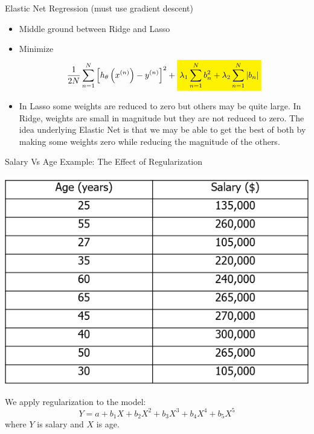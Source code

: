 \documentclass[11pt]{beamer}
\newcommand{\highlight}[1]{%
  \colorbox{yellow!100}{$\displaystyle#1$}}
\begin{document}
\begin{frame}{Elastic Net Regression (must use gradient descent)}
	\begin{itemize}
		\item Middle ground between Ridge and Lasso
		\item Minimize
		\begin{equation}
		\frac{1}{2N} \sum\limits_{n=1}^N \left[h_\theta \left( x^{(n)} \right) - y ^{(n)}\right]^2 + \highlight{\lambda_1 \sum\limits_{n=1}^N b_n^2 + \lambda_2 \sum\limits_{n=1}^N \vert b_n \vert}
		\end{equation}
		\item In Lasso some weights are reduced to zero but others may be quite large. In Ridge, weights are small in magnitude but they are not reduced to zero. The idea underlying Elastic Net is that we may be able to get the best of both by making some weights zero while reducing the magnitude of the others.
	\end{itemize}
\end{frame}
\begin{frame}{Salary Vs Age Example: The Effect of Regularization}
	\begin{center}
	\includegraphics[scale=.4]{../05-pictures/lesson-2-2_pic_17.png}
	\end{center}
We apply regularization to the model:
\begin{equation}
Y = a + b_1X + b_2X^2 + b_3X^3 + b_4X^4 + b_5 X^5
\end{equation}
where $Y$ is salary and $X$ is age.
\end{frame}
\end{document}
